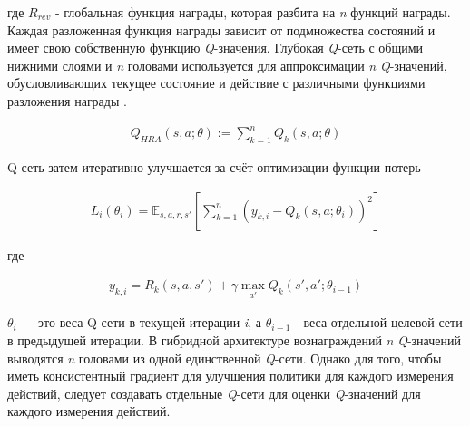где $R_{rev}$ - глобальная функция награды, которая разбита на \textit{n} функций награды. Каждая разложенная функция награды зависит от подмножества состояний и имеет свою собственную функцию \textit{Q}-значения. Глубокая \textit{Q}-сеть с общими нижними слоями и \textit{n} головами используется для аппроксимации \textit{n} \textit{Q}-значений, обусловливающих текущее состояние и действие с различными функциями разложения награды .

\begin{equation}
    \begin{multlined}
        Q_{H R A}(s, a; \theta) := \sum^n_{k=1} Q_k(s, a;\theta)
    \end{multlined}
\end{equation}

Q-сеть затем итеративно улучшается за счёт оптимизации функции потерь

\begin{equation}
    \begin{multlined}
        L_i(\theta_i) = \mathbb{E}_{s, a, r, s'}[\sum^n_{k=1}(y_{k, i}-Q_k(s, a;\theta_i))^2]
    \end{multlined}
\end{equation}

где

\begin{equation}
    \begin{multlined}
        y_{k, i} = R_k(s, a, s') + \gamma \max_{a'} Q_k(s', a';\theta_{i-1})
    \end{multlined}
\end{equation}

$\theta_i$ — это веса Q-сети в текущей итерации \textit{i}, а $\theta_{i-1}$ - веса отдельной целевой сети в предыдущей итерации.
В гибридной архитектуре вознаграждений \textit{n} \textit{Q}-значений выводятся \textit{n} головами из одной единственной \textit{Q}-сети. Однако для того, чтобы иметь консистентный градиент для улучшения политики для каждого измерения действий, следует создавать отдельные \textit{Q}-сети для оценки \textit{Q}-значений для каждого измерения действий.
